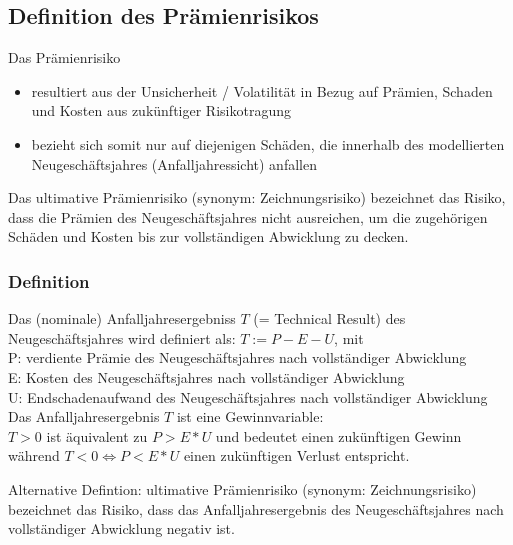 \documentclass[12pt]{report}
\theoremstyle{dotless}
\theoremstyle{definition}
\begin{document}
\subsection{Definition des Prämienrisikos}

Das Prämienrisiko
\begin{itemize}
\item resultiert aus der Unsicherheit / Volatilität in Bezug auf Prämien, Schaden und Kosten aus zukünftiger Risikotragung
\item bezieht sich somit nur auf diejenigen Schäden, die innerhalb des modellierten Neugeschäftsjahres (Anfalljahressicht) anfallen
\end{itemize}

Das ultimative Prämienrisiko (synonym: Zeichnungsrisiko) bezeichnet das Risiko,
dass die Prämien des Neugeschäftsjahres nicht ausreichen, um die zugehörigen Schäden
und Kosten bis zur vollständigen Abwicklung zu decken.

\subsubsection{Definition}
Das (nominale) Anfalljahresergebniss $T$ (= Technical Result) des Neugeschäftsjahres wird definiert als: $T:= P - E - U$, mit \\
P: verdiente Prämie des Neugeschäftsjahres nach vollständiger Abwicklung\\
E: Kosten des Neugeschäftsjahres nach vollständiger Abwicklung \\
U: Endschadenaufwand des Neugeschäftsjahres nach vollständiger Abwicklung \\

Das Anfalljahresergebnis $T$ ist eine Gewinnvariable: \\
$T>0$ ist äquivalent zu $P>E*U$ und bedeutet einen zukünftigen Gewinn \\
während $T<0 \Leftrightarrow P<E*U$ einen zukünftigen Verlust entspricht.

Alternative Defintion: ultimative Prämienrisiko (synonym: Zeichnungsrisiko) bezeichnet das Risiko, dass das Anfalljahresergebnis des Neugeschäftsjahres nach vollständiger Abwicklung negativ ist.
\end{document}
